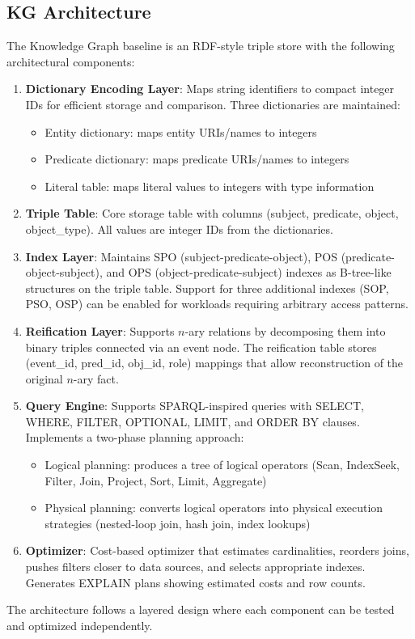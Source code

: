 \subsection{KG Architecture}

The Knowledge Graph baseline is an RDF-style triple store with the following architectural components:

\begin{enumerate}
    \item \textbf{Dictionary Encoding Layer}: Maps string identifiers to compact integer IDs for efficient storage and comparison. Three dictionaries are maintained:
    \begin{itemize}
        \item Entity dictionary: maps entity URIs/names to integers
        \item Predicate dictionary: maps predicate URIs/names to integers
        \item Literal table: maps literal values to integers with type information
    \end{itemize}
    
    \item \textbf{Triple Table}: Core storage table with columns (subject, predicate, object, object\_type). All values are integer IDs from the dictionaries.
    
    \item \textbf{Index Layer}: Maintains SPO (subject-predicate-object), POS (predicate-object-subject), and OPS (object-predicate-subject) indexes as B-tree-like structures on the triple table. Support for three additional indexes (SOP, PSO, OSP) can be enabled for workloads requiring arbitrary access patterns.
    
    \item \textbf{Reification Layer}: Supports $n$-ary relations by decomposing them into binary triples connected via an event node. The reification table stores (event\_id, pred\_id, obj\_id, role) mappings that allow reconstruction of the original $n$-ary fact.
    
    \item \textbf{Query Engine}: Supports SPARQL-inspired queries with SELECT, WHERE, FILTER, OPTIONAL, LIMIT, and ORDER BY clauses. Implements a two-phase planning approach:
    \begin{itemize}
        \item Logical planning: produces a tree of logical operators (Scan, IndexSeek, Filter, Join, Project, Sort, Limit, Aggregate)
        \item Physical planning: converts logical operators into physical execution strategies (nested-loop join, hash join, index lookups)
    \end{itemize}
    
    \item \textbf{Optimizer}: Cost-based optimizer that estimates cardinalities, reorders joins, pushes filters closer to data sources, and selects appropriate indexes. Generates EXPLAIN plans showing estimated costs and row counts.
\end{enumerate}

The architecture follows a layered design where each component can be tested and optimized independently.
